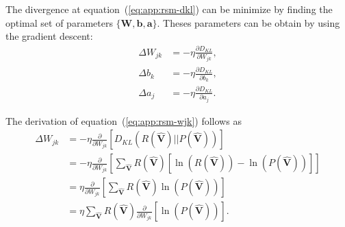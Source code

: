 The divergence at equation~(\ref{eq:app:rsm-dkl}) can be minimize by finding the optimal set of parameters $\{\mathbf{W}, \mathbf{b}, \mathbf{a}\}$. Theses parameters can be obtain by using the gradient descent:
\begin{align}
    \label{eq:app:rsm-wjk}
    \Delta W_{jk} &= -\eta \frac{\partial D_{KL}}{\partial W_{jk}}, \\ %
    \label{eq:app:rsm-bk}
    \Delta b_{k} &= -\eta \frac{\partial D_{KL}}{\partial b_{k}}, \\ %
    \label{eq:app:rsm-aj}
    \Delta a_{j} &= -\eta \frac{\partial D_{KL}}{\partial a_{j}}.
\end{align}

The derivation of equation~(\ref{eq:app:rsm-wjk}) follows as
\begin{align}
    \Delta W_{jk} &= -\eta \frac{\partial }{\partial W_{jk}} \left[ D_{KL}(R(\mathbf{\hat{V}}) || P(\mathbf{\hat{V}})) \right] \nonumber \\ %
    &= -\eta \frac{\partial}{\partial W_{jk}} \left[ \sum_{\mathbf{\hat{V}}} R(\mathbf{\hat{V}}) \left[ \ln\left(R(\mathbf{\hat{V}})\right) - \ln\left(P(\mathbf{\hat{V}})\right) \right] \right] \nonumber \\ %
    &= \eta \frac{\partial}{\partial W_{jk}} \left[ \sum_{\mathbf{\hat{V}}} R(\mathbf{\hat{V}}) \ln\left(P(\mathbf{\hat{V}})\right) \right] \nonumber \\ %
    \label{eq:app:rsm-wjk-step1}
    &= \eta \sum_{\mathbf{\hat{V}}} R(\mathbf{\hat{V}}) \frac{\partial}{\partial W_{jk}} \left[ \ln\left(P(\mathbf{\hat{V}})\right) \right]. %
\end{align}

